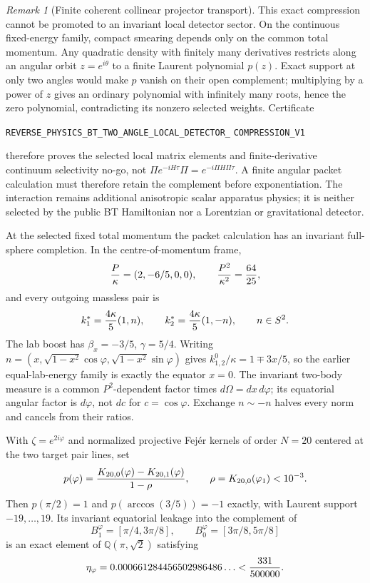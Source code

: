 \documentclass[11pt]{article}
\theoremstyle{definition}
\theoremstyle{remark}
\newtheorem{remark}[theorem]{Remark}
\begin{document}
\begin{remark}[Finite coherent collinear projector transport]
This exact compression cannot be promoted to an invariant local detector
sector.  On the continuous fixed-energy family, compact smearing depends only
on the common total momentum.  Any quadratic density with finitely many
derivatives restricts along an angular orbit $z=e^{i\theta}$ to a finite
Laurent polynomial $p(z)$.  Exact support at only two angles would make
$p$ vanish on their open complement; multiplying by a power of $z$ gives
an ordinary polynomial with infinitely many roots, hence the zero polynomial,
contradicting its nonzero selected weights.  Certificate
\par\noindent
\texttt{REVERSE\_PHYSICS\_BT\_TWO\_ANGLE\_LOCAL\_DETECTOR\_}
\allowbreak\texttt{COMPRESSION\_V1}
\par\noindent
therefore proves the selected local matrix elements and finite-derivative
continuum selectivity no-go, not
$\Pi e^{-iH\tau}\Pi=e^{-i\Pi H\Pi\tau}$.  A finite angular packet calculation
must therefore retain the complement before exponentiation.  The interaction remains
additional anisotropic scalar apparatus physics; it is neither selected by
the public BT Hamiltonian nor a Lorentzian or gravitational detector.

At the selected fixed total momentum the packet calculation has an invariant
full-sphere completion.  In the centre-of-momentum frame,
\[
 {P\over\kappa}=(2,-6/5,0,0),\qquad {P^2\over\kappa^2}={64\over25},
\]
and every outgoing massless pair is
\[
 k_1^*={4\kappa\over5}(1,n),\qquad
 k_2^*={4\kappa\over5}(1,-n),\qquad n\in S^2.
\]
The lab boost has $\beta_x=-3/5$, $\gamma=5/4$.  Writing
$n=(x,\sqrt{1-x^2}\cos\varphi,\sqrt{1-x^2}\sin\varphi)$ gives
$k_{1,2}^0/\kappa=1\mp3x/5$, so the earlier equal-lab-energy family is
exactly the equator $x=0$.  The invariant two-body measure is a common
$P^2$-dependent factor times $d\Omega=dx\,d\varphi$; its equatorial angular
factor is $d\varphi$, not $dc$ for $c=\cos\varphi$.  Exchange $n\sim-n$
halves every norm and cancels from their ratios.

With $\zeta=e^{2i\varphi}$ and normalized projective Fej\'er kernels of order
$N=20$ centered at the two target pair lines, set
\[
 p(\varphi)={K_{20,0}(\varphi)-K_{20,1}(\varphi)\over1-\rho},
 \qquad \rho=K_{20,0}(\varphi_1)<10^{-3}.
\]
Then $p(\pi/2)=1$ and $p(\arccos(3/5))=-1$ exactly, with Laurent support
$-19,\ldots,19$.  Its invariant equatorial leakage into the complement of
\[
 B_1^\varphi=[\pi/4,3\pi/8],\qquad
 B_0^\varphi=[3\pi/8,5\pi/8]
\]
is an exact element of $\mathbb Q(\pi,\sqrt2)$ satisfying
\[
 \eta_\varphi=0.000661284456502986486\ldots<{331\over500000}.
\]


\end{remark}
\end{document}
